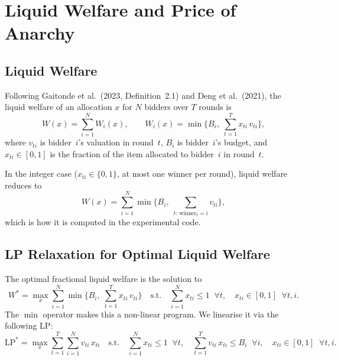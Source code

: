 \section{Liquid Welfare and Price of Anarchy}
\label{sec:appendix_welfare}

\subsection{Liquid Welfare}

Following Gaitonde et al.\ (2023, Definition~2.1) and Deng et al.\ (2021), the liquid welfare of an allocation $x$ for $N$ bidders over $T$ rounds is
\begin{equation}
  W(x) = \sum_{i=1}^{N} W_i(x), \qquad
  W_i(x) = \min\!\Big\{B_i,\; \sum_{t=1}^{T} x_{ti}\, v_{ti}\Big\},
  \label{eq:liquid_welfare_def}
\end{equation}
where $v_{ti}$ is bidder~$i$'s valuation in round~$t$, $B_i$ is bidder~$i$'s budget, and $x_{ti} \in [0,1]$ is the fraction of the item allocated to bidder~$i$ in round~$t$.

In the integer case ($x_{ti} \in \{0,1\}$, at most one winner per round), liquid welfare reduces to
\begin{equation}
  W(x) = \sum_{i=1}^{N} \min\!\Big\{B_i,\; \sum_{t:\, \text{winner}_t = i} v_{ti}\Big\},
  \label{eq:liquid_welfare_integer}
\end{equation}
which is how it is computed in the experimental code.

\subsection{LP Relaxation for Optimal Liquid Welfare}

The optimal fractional liquid welfare is the solution to
\begin{equation}
  W^* = \max_{x} \sum_{i=1}^{N} \min\!\Big\{B_i,\; \sum_{t=1}^{T} x_{ti}\, v_{ti}\Big\}
  \quad \text{s.t.} \quad
  \sum_{i=1}^{N} x_{ti} \leq 1 \;\; \forall t, \quad
  x_{ti} \in [0,1] \;\; \forall t,i.
  \label{eq:welfare_opt}
\end{equation}
The $\min$ operator makes this a non-linear program. We linearise it via the following LP:
\begin{equation}
  \text{LP}^* = \max_{x} \sum_{t=1}^{T} \sum_{i=1}^{N} v_{ti}\, x_{ti}
  \quad \text{s.t.} \quad
  \sum_{i=1}^{N} x_{ti} \leq 1 \;\; \forall t, \quad
  \sum_{t=1}^{T} v_{ti}\, x_{ti} \leq B_i \;\; \forall i, \quad
  x_{ti} \in [0,1] \;\; \forall t,i.
  \label{eq:welfare_lp}
\end{equation}


